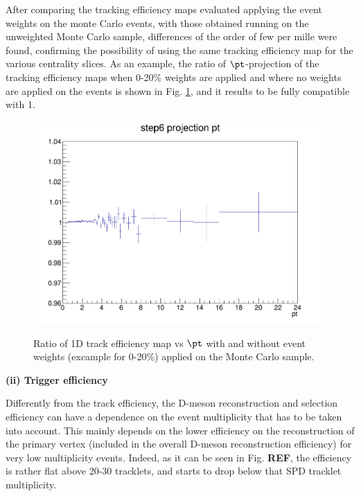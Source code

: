 After comparing the tracking efficiency maps evaluated applying the event weights on the monte Carlo events, with those obtained running on the unweighted Monte Carlo sample, differences of the order of few per mille were found, confirming the possibility of using the same tracking efficiency map for the various centrality slices.
As an example, the ratio of $\pt$-projection of the tracking efficiency maps when 0-20\% weights are applied and where no weights are applied on the events is shown in Fig. \ref{fig:TrackEFfWeights}, and it results to be fully compatible with 1.

\begin{figure}
\centering
{\includegraphics[width=0.7\linewidth]{figuresVsCent/Global/CrossCheck_TrackEffWeight.png}}
 \caption{Ratio of 1D track efficiency map vs $\pt$ with and without event weights (excample for 0-20\%) applied on the Monte Carlo sample.}
\label{fig:TrackEFfWeights}
\end{figure}

{\bf (ii) Trigger efficiency}

Differently from the track efficiency, the D-meson reconstruction and selection efficiency can have a dependence on the event multiplicity that has to be taken into account. This mainly depends on the lower efficiency on the reconstruction of the primary vertex (included in the overall D-meson reconstruction efficiency) for very low multiplicity events. Indeed, as it can be seen in Fig. {\bf REF}, the efficiency is rather flat above 20-30 tracklets, and starts to drop below that SPD tracklet multiplicity.




